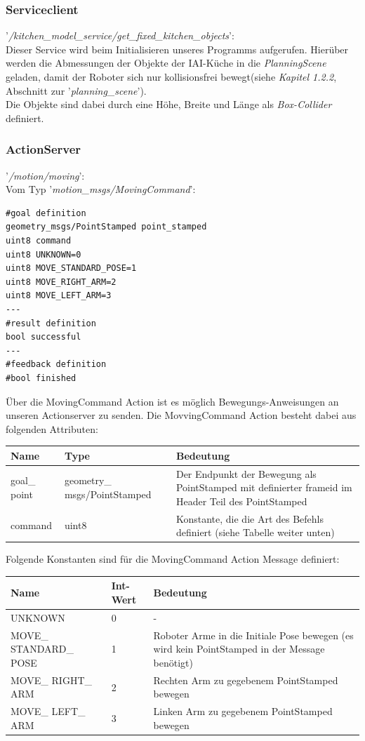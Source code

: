 \documentclass{suturo}
\begin{document}
\subsubsection{Serviceclient}
'\textit{/kitchen\_model\_service/get\_fixed\_kitchen\_objects}': \\
Dieser Service wird beim Initialisieren unseres Programms aufgerufen. Hierüber werden die Abmessungen der Objekte der IAI-Küche in die \textit{PlanningScene} geladen, damit der Roboter sich nur kollisionsfrei bewegt(siehe \textit{Kapitel 1.2.2}, Abschnitt zur '\textit{planning\_scene}').\\
Die Objekte sind dabei durch eine Höhe, Breite und Länge als \textit{Box-Collider} definiert.


\subsubsection{ActionServer}
'\textit{/motion/moving}': \\
Vom Typ '\textit{motion\_msgs/MovingCommand}': \\
\begin{lstlisting}
#goal definition
geometry_msgs/PointStamped point_stamped
uint8 command
uint8 UNKNOWN=0
uint8 MOVE_STANDARD_POSE=1
uint8 MOVE_RIGHT_ARM=2
uint8 MOVE_LEFT_ARM=3
---
#result definition
bool successful
---
#feedback definition
#bool finished
\end{lstlisting}
\newpage
Über die MovingCommand Action ist es möglich Bewegungs-Anweisungen an unseren Actionserver zu senden. Die MovvingCommand Action besteht dabei aus folgenden Attributen:
\begin{center}
	\begin{tabular}{ l | l | p{7cm}}
		Name & Type & Bedeutung \\ \hline
		goal\_ point & geometry\_ msgs/PointStamped & Der Endpunkt der Bewegung als PointStamped mit definierter frameid im Header Teil des PointStamped \\ \hline
		command & uint8 & Konstante, die die Art des Befehls definiert (siehe Tabelle weiter unten) \\
	\end{tabular}
\end{center}

Folgende Konstanten sind für die MovingCommand Action Message definiert:

\begin{center}
	\begin{tabular}{ l | l | p{7cm}}
		Name & Int-Wert & Bedeutung \\ \hline
		UNKNOWN & 0 & - \\ \hline
		MOVE\_ STANDARD\_ POSE & 1 & Roboter Arme in die Initiale Pose bewegen (es wird kein PointStamped in der Message benötigt) \\ \hline
		MOVE\_ RIGHT\_ ARM & 2 & Rechten Arm zu gegebenem PointStamped bewegen \\ \hline
		MOVE\_ LEFT\_ ARM & 3 & Linken Arm zu gegebenem PointStamped bewegen \\
	\end{tabular}
\end{center}
\end{document}
